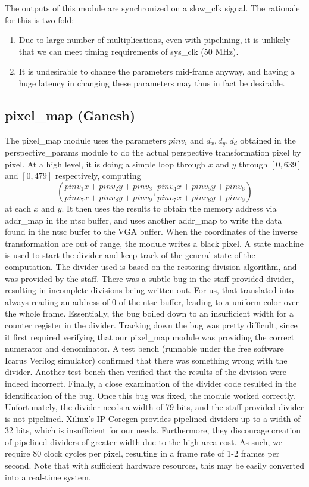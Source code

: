 \documentclass{article}
\begin{document}
The outputs of this module are synchronized on a slow\_clk signal.
The rationale for this is two fold:
\begin{enumerate}
    \item Due to large number of multiplications, even with pipelining, it is unlikely that we can meet timing requirements of sys\_clk (50 MHz).
    \item It is undesirable to change the parameters mid-frame anyway, and having a huge latency in changing these parameters may thus in fact be desirable.
\end{enumerate}

\subsection{pixel\_map (Ganesh)}
The pixel\_map module uses the parameters $pinv_i$ and $d_x, d_y, d_d$ obtained in the perspective\_params module to do the actual perspective transformation pixel by pixel.
At a high level, it is doing a simple loop through $x$ and $y$ through $[0, 639]$ and $[0, 479]$ respectively, computing
\begin{equation*}
    \left( \frac{pinv_1 x + pinv_2 y + pinv_3}{pinv_7 x + pinv_8 y + pinv_9}, \frac{pinv_4 x + pinv_5 y + pinv_6}{pinv_7 x + pinv_8 y + pinv_9} \right)
\end{equation*}
at each $x$ and $y$.
It then uses the results to obtain the memory address via addr\_map in the ntsc buffer,
and uses another addr\_map to write the data found in the ntsc buffer to the VGA buffer.
When the coordinates of the inverse transformation are out of range,
the module writes a black pixel.
A state machine is used to start the divider and keep track of the general state of the computation.
The divider used is based on the restoring division algorithm,
and was provided by the staff.
There was a subtle bug in the staff-provided divider, resulting in incomplete divisions being written out.
For us, that translated into always reading an address of $0$ of the ntsc buffer,
leading to a uniform color over the whole frame.
Essentially, the bug boiled down to an insufficient width for a counter register in the divider.
Tracking down the bug was pretty difficult,
since it first required verifying that our pixel\_map module was providing the correct numerator and denominator.
A test bench (runnable under the free software Icarus Verilog simulator) confirmed that there was something wrong with the divider.
Another test bench then verified that the results of the division were indeed incorrect.
Finally, a close examination of the divider code resulted in the identification of the bug.
Once this bug was fixed, the module worked correctly.
Unfortunately, the divider needs a width of 79 bits, and the staff provided divider is not pipelined.
Xilinx's IP Coregen provides pipelined dividers up to a width of 32 bits, which is insufficient for our needs.
Furthermore, they discourage creation of pipelined dividers of greater width due to the high area cost.
As such, we require 80 clock cycles per pixel, resulting in a frame rate of 1-2 frames per second.
Note that with sufficient hardware resources, this may be easily converted into a real-time system.
\end{document}
